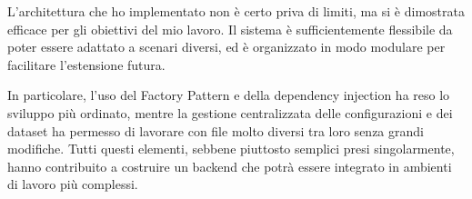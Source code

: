 L'architettura che ho implementato non è certo priva di limiti, ma si è dimostrata efficace per gli obiettivi del mio lavoro. Il sistema è sufficientemente flessibile da poter essere adattato a scenari diversi, ed è organizzato in modo modulare per facilitare l'estensione futura.


In particolare, l'uso del Factory Pattern e della dependency injection ha reso lo sviluppo più ordinato, mentre la gestione centralizzata delle configurazioni e dei dataset ha permesso di lavorare con file molto diversi tra loro senza grandi modifiche. Tutti questi elementi, sebbene piuttosto semplici presi singolarmente, hanno contribuito a costruire un backend che potrà essere integrato in ambienti di lavoro più complessi.
